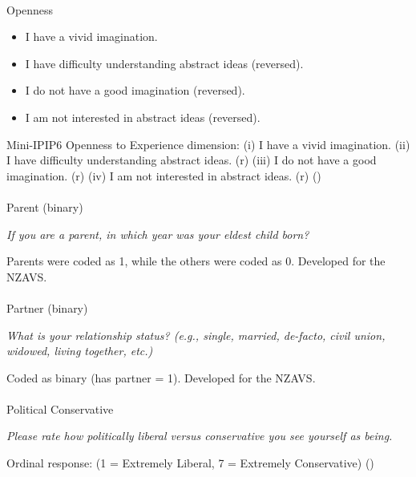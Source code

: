 \documentclass[
  single column]{article}
\makeatletter
\let\oldparagraph\paragraph
\renewcommand{\paragraph}{
    \@ifstar
      \xxxParagraphStar
      \xxxParagraphNoStar
  }
\newcommand{\xxxParagraphStar}[1]{\oldparagraph*{#1}\mbox{}}
\newcommand{\xxxParagraphNoStar}[1]{\oldparagraph{#1}\mbox{}}
\providecommand{\tightlist}{%
  \setlength{\itemsep}{0pt}\setlength{\parskip}{0pt}}\usepackage{longtable,booktabs,array}
\makeatother
\begin{document}
\paragraph{Openness}\label{openness}

\begin{itemize}
\tightlist
\item
  I have a vivid imagination.
\item
  I have difficulty understanding abstract ideas (reversed).
\item
  I do not have a good imagination (reversed).
\item
  I am not interested in abstract ideas (reversed).
\end{itemize}

Mini-IPIP6 Openness to Experience dimension: (i) I have a vivid
imagination. (ii) I have difficulty understanding abstract ideas. (r)
(iii) I do not have a good imagination. (r) (iv) I am not interested in
abstract ideas. (r) ()

\paragraph{Parent (binary)}\label{parent-binary}

\emph{If you are a parent, in which year was your eldest child born?}

Parents were coded as 1, while the others were coded as 0. Developed for
the NZAVS.

\paragraph{Partner (binary)}\label{partner-binary}

\emph{What is your relationship status? (e.g., single, married,
de-facto, civil union, widowed, living together, etc.)}

Coded as binary (has partner = 1). Developed for the NZAVS.

\paragraph{Political Conservative}\label{political-conservative}

\emph{Please rate how politically liberal versus conservative you see
yourself as being.}

Ordinal response: (1 = Extremely Liberal, 7 = Extremely Conservative)
()
\end{document}
